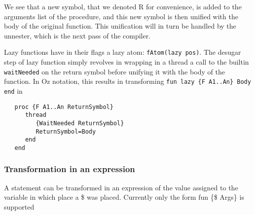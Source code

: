 \documentclass[a4paper]{memoir}
\begin{document}
We see that a new symbol, that we denoted R for convenience, is added to the arguments list of the procedure, and this new symbol is then unified with the body of the original function. This unification will in turn be handled by the unnester, which is the next pass of the compiler.

Lazy functions have in their flags a lazy atom: \lstinline!fAtom(lazy pos)!.
The desugar step of lazy function simply revolves in wrapping in a thread a call to the builtin \lstinline!waitNeeded! on the return symbol before unifying it with the body of the function. In Oz notation, this results in transforming \lstinline!fun lazy {F A1..An} Body end! in 
\begin{lstlisting}
   proc {F A1..An ReturnSymbol}
      thread 
         {WaitNeeded ReturnSymbol}
         ReturnSymbol=Body
      end
   end
\end{lstlisting}


\subsubsection{Transformation in an expression}
A statement can be transformed in an expression of the value assigned to the variable in which place a \$ was placed.
Currently only the form fun \{\$ Args\} is supported
\end{document}
